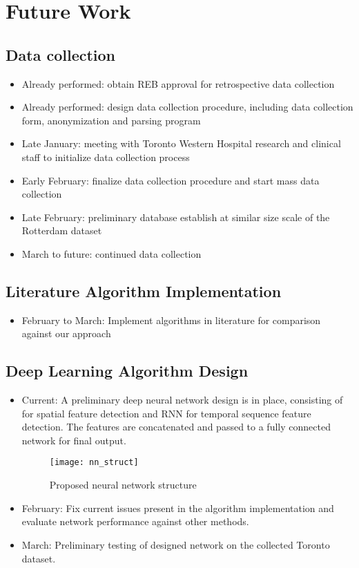\chapter{Future Work}

\section{Data collection}

\begin{itemize}
	\item Already performed: obtain REB approval for retrospective data collection
	\item Already performed: design data collection procedure, including data collection form, anonymization and parsing program
	\item Late January: meeting with Toronto Western Hospital research and clinical staff to initialize data collection process
	\item Early February: finalize data collection procedure and start mass data collection
	\item Late February: preliminary database establish at similar size scale of the Rotterdam dataset
	\item March to future: continued data collection
\end{itemize}

\section{Literature Algorithm Implementation}

\begin{itemize}
	\item February to March: Implement algorithms in literature for comparison against our approach
\end{itemize}

\section{Deep Learning Algorithm Design}

\begin{itemize}
	\item Current: A preliminary deep neural network design is in place, consisting of  for spatial feature detection and  \ac{RNN} for temporal sequence feature detection. The features are concatenated and passed to a fully connected network for final output. 
	
	\begin{figure}[h]
		\centering
		\texttt{[image: nn\_struct]}	\caption{Proposed neural network structure}
		\label{fig:nn_struct}
	\end{figure}

	\item February: Fix current issues present in the algorithm implementation and evaluate network performance against other methods.
	
	\item March: Preliminary testing of designed network on the collected Toronto dataset.
	
\end{itemize}

